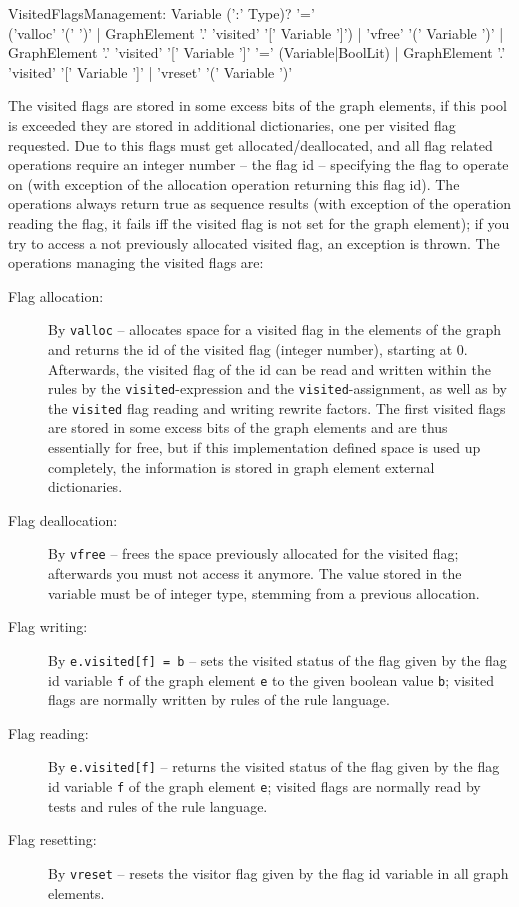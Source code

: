 \begin{rail}
  VisitedFlagsManagement:
    Variable (':' Type)? '=' \\('valloc' '(' ')' | GraphElement '.' 'visited' '[' Variable ']') |
    'vfree' '(' Variable ')' |
    GraphElement '.' 'visited' '[' Variable ']' '=' (Variable|BoolLit) |
    GraphElement '.' 'visited' '[' Variable ']' |
    'vreset' '(' Variable ')'
\end{rail}
The visited flags are stored in some excess bits of the graph elements, if this pool is exceeded they are stored in additional dictionaries, one per visited flag requested.
Due to this flags must get allocated/deallocated, and all flag related operations require an integer number -- the flag id -- specifying the flag to operate on (with exception of the allocation operation returning this flag id).
The operations always return true as sequence results (with exception of the operation reading the flag, it fails iff the visited flag is not set for the graph element);
if you try to access a not previously allocated visited flag, an exception is thrown.
The operations managing the visited flags are:
\begin{description}
\item[Flag allocation:] By \texttt{valloc}\label{allocvisitflag} -- allocates space for a visited flag in the elements of the graph and returns the id of the visited flag (integer number), starting at 0.
Afterwards, the visited flag of the id can be read and written within the rules by the \texttt{visited}-expression and the \texttt{visited}-assignment,
as well as by the \texttt{visited} flag reading and writing rewrite factors.
The first visited flags are stored in some excess bits of the graph elements and are thus essentially for free,
but if this implementation defined space is used up completely, the information is stored in graph element external dictionaries.
\item[Flag deallocation:] By \texttt{vfree} -- frees the space previously allocated for the visited flag; afterwards you must not access it anymore. 
The value stored in the variable must be of integer type, stemming from a previous allocation.
\item[Flag writing:] By \texttt{e.visited[f] = b} -- sets the visited status of the flag given by the flag id variable \texttt{f} of the graph element \texttt{e} to the given boolean value \texttt{b}; visited flags are normally written by rules of the rule language.
\item[Flag reading:] By \texttt{e.visited[f]} -- returns the visited status of the flag given by the flag id variable \texttt{f} of the graph element \texttt{e}; visited flags are normally read by tests and rules of the rule language.
\item[Flag resetting:] By \texttt{vreset} -- resets the visitor flag given by the flag id variable in all graph elements.
\end{description}


